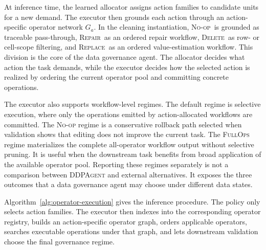 \documentclass[sigconf, nonacm]{acmart}
\newcommand{\sys}{\textsc{DDPAgent}\xspace}
\newcommand{\noop}{\textsc{No-op}\xspace}
\newcommand{\repair}{\textsc{Repair}\xspace}
\newcommand{\deleteop}{\textsc{Delete}\xspace}
\newcommand{\replaceop}{\textsc{Replace}\xspace}
\newcommand{\fullops}{\textsc{FullOps}\xspace}
\begin{document}
At inference time, the learned allocator assigns action families to candidate units for a new demand. The executor then grounds each action through an action-specific operator network $G_a$. In the cleaning instantiation, \noop\ is grounded as traceable pass-through, \repair\ as an ordered repair workflow, \deleteop\ as row- or cell-scope filtering, and \replaceop\ as an ordered value-estimation workflow. This division is the core of the data governance agent. The allocator decides what action the task demands, while the executor decides how the selected action is realized by ordering the current operator pool and committing concrete operations.

The executor also supports workflow-level regimes. The default regime is selective execution, where only the operations emitted by action-allocated workflows are committed. The \noop regime is a conservative rollback path selected when validation shows that editing does not improve the current task. The \fullops regime materializes the complete all-operator workflow output without selective pruning. It is useful when the downstream task benefits from broad application of the available operator pool. Reporting these regimes separately is not a comparison between \sys and external alternatives. It exposes the three outcomes that a data governance agent may choose under different data states.

Algorithm~\ref{alg:operator-execution} gives the inference procedure. The policy only selects action families. The executor then indexes into the corresponding operator registry, builds an action-specific operator graph, orders applicable operators, searches executable operations under that graph, and lets downstream validation choose the final governance regime.
\end{document}
